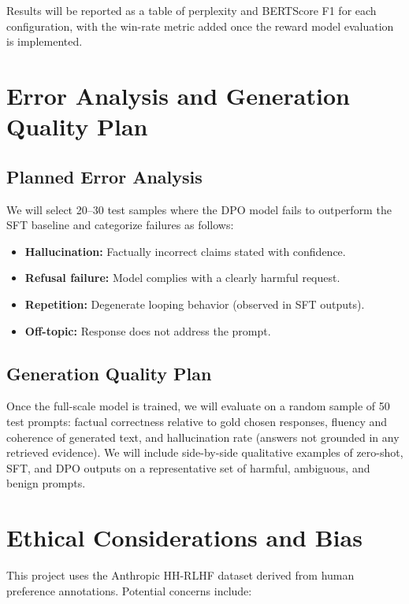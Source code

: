 \documentclass[12pt,a4paper]{article}
\begin{document}
Results will be reported as a table of perplexity and BERTScore F1 for each
configuration, with the win-rate metric added once the reward model evaluation
is implemented.

\section{Error Analysis and Generation Quality Plan}

\subsection*{Planned Error Analysis}

We will select 20--30 test samples where the DPO model fails to outperform the SFT
baseline and categorize failures as follows:

\begin{itemize}[noitemsep]
    \item \textbf{Hallucination:} Factually incorrect claims stated with confidence.
    \item \textbf{Refusal failure:} Model complies with a clearly harmful request.
    \item \textbf{Repetition:} Degenerate looping behavior (observed in SFT outputs).
    \item \textbf{Off-topic:} Response does not address the prompt.
\end{itemize}

\subsection*{Generation Quality Plan}

Once the full-scale model is trained, we will evaluate on a random sample of 50 test
prompts: factual correctness relative to gold chosen responses, fluency and coherence
of generated text, and hallucination rate (answers not grounded in any retrieved
evidence). We will include side-by-side qualitative examples of zero-shot, SFT, and
DPO outputs on a representative set of harmful, ambiguous, and benign prompts.

\section{Ethical Considerations and Bias}

This project uses the Anthropic HH-RLHF dataset derived from human preference
annotations. Potential concerns include:
\end{document}
